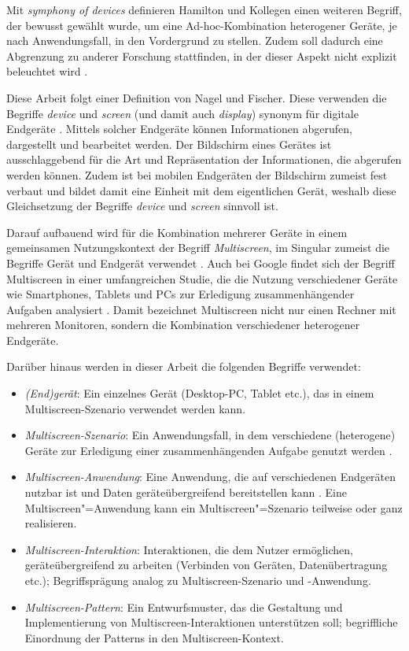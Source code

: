 Mit \textit{symphony of devices} definieren Hamilton und Kollegen einen weiteren Begriff, der bewusst gewählt wurde, um eine Ad-hoc-Kombination heterogener Geräte, je nach Anwendungsfall, in den Vordergrund zu stellen. Zudem soll dadurch eine Abgrenzung zu anderer Forschung stattfinden, in der dieser Aspekt nicht explizit beleuchtet wird \citep{Hamilton2014}.

Diese Arbeit folgt einer Definition von Nagel und Fischer. Diese verwenden die Begriffe \textit{device} und \textit{screen} (und damit auch \textit{display}) synonym für digitale Endgeräte \citep[16]{Nagel2013}. Mittels solcher Endgeräte können Informationen abgerufen, dargestellt und bearbeitet werden. Der Bildschirm eines Gerätes ist ausschlaggebend für die Art und Repräsentation der Informationen, die abgerufen werden können. Zudem ist bei mobilen Endgeräten der Bildschirm zumeist fest verbaut und bildet damit eine Einheit mit dem eigentlichen Gerät, weshalb diese Gleichsetzung der Begriffe \textit{device} und \textit{screen} sinnvoll ist.

Darauf aufbauend wird für die Kombination mehrerer Geräte in einem gemeinsamen Nutzungskontext der Begriff \textit{Multiscreen}, im Singular zumeist die Begriffe Gerät und Endgerät verwendet \citep{Nagel2013}. Auch bei Google findet sich der Begriff Multiscreen in einer umfangreichen Studie, die die Nutzung verschiedener Geräte wie Smartphones, Tablets und PCs zur Erledigung zusammenhängender Aufgaben analysiert \citep{Google2012}. Damit bezeichnet Multiscreen nicht nur einen Rechner mit mehreren Monitoren, sondern die Kombination verschiedener heterogener Endgeräte.

Darüber hinaus werden in dieser Arbeit die folgenden Begriffe verwendet:
\begin{itemize}
\item \textit{(End)gerät}: Ein einzelnes Gerät (\zb Desktop-PC, Tablet etc.), das in einem Multiscreen-Szenario verwendet werden kann.
\item \textit{Multiscreen-Szenario}: Ein Anwendungsfall, in dem verschiedene (heterogene) Geräte zur Erledigung einer zusammenhängenden Aufgabe genutzt werden \citep[19]{Nagel2013}.
\item \textit{Multiscreen-Anwendung}: Eine Anwendung, die auf verschiedenen Endgeräten nutzbar ist und Daten geräteübergreifend bereitstellen kann \citep[18]{Nagel2013}. Eine Multiscreen"=Anwendung kann ein Multiscreen"=Szenario teilweise oder ganz realisieren.
\item \textit{Multiscreen-Interaktion}: Interaktionen, die dem Nutzer ermöglichen, geräteübergreifend zu arbeiten (\zb Verbinden von Geräten, Datenübertragung etc.); Begriffsprägung analog zu Multiscreen-Szenario und -Anwendung.
\item \textit{Multiscreen-Pattern}: Ein Entwurfsmuster, das die Gestaltung und Implementierung von Multiscreen-Interaktionen unterstützen soll; begriffliche Einordnung der Patterns in den Multiscreen-Kontext.
\end{itemize}

